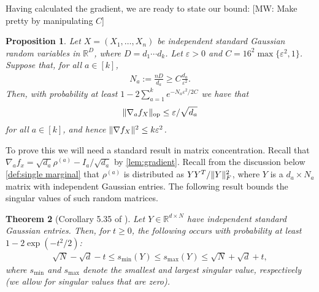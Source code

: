 \documentclass{article}
\newtheorem{theorem}{Theorem}
\newtheorem{prop}[theorem]{Proposition}
\DeclarePairedDelimiter{\norm}{\lVert}{\rVert}
\newcommand{\R}{{\mathbb{R}}}
\newcommand{\op}{\operatorname{op}}
\newcommand\eps{\varepsilon}
\newcommand\samp{x}
\newcommand\rv{X}
\newcommand{\MW}[1]{{\color{red}[MW: #1]}}
\begin{document}
Having calculated the gradient, we are ready to state our bound:
\MW{Make pretty by manipulating $C$}
\begin{prop}\label{prop:gradient-bound}
Let $\rv = (\rv_1,\dots,\rv_n)$ be independent standard Gaussian random variables in $\R^D$, where $D=d_1\cdots{}d_k$.
Let $\eps>0$ and $C = 16^2\max\{\eps^2,1\}$.
Suppose that, for all $a \in [k]$,
\begin{align*}
  N_a := \frac{n D}{d_a} \geq C \frac{d_a}{\eps^2}.
\end{align*}
Then, with probability at least $1 - 2 \sum_{a=1}^k e^{-N_a \eps^2/2C}$ we have that
\begin{align*}
  \norm{\nabla_a f_{\rv}}_{\op} \leq \eps/\sqrt{d_a}
\end{align*}
for all $a\in[k]$, and hence $\norm{\nabla f_{\rv}}^2 \leq k \eps^2$.
\end{prop}

To prove this we will need a standard result in matrix concentration.
Recall that $\nabla_a f_{\samp} = \sqrt{d_a} \rho^{(a)} - I_a/\sqrt{d_a}$ by \cref{lem:gradient}.
Recall from the discussion below \cref{def:single marginal} that $\rho^{(a)}$ is distributed as $Y Y^T / \norm{Y}_F^2$, where $Y$ is a $d_a \times N_a$ matrix with independent Gaussian entries.
The following result bounds the singular values of such random matrices.

\begin{theorem}[Corollary 5.35 of \cite{vershynin2010introduction}]\label{cor:vershynin}
Let $Y \in \R^{d \times N}$ have independent standard Gaussian entries.
Then, for $t \geq 0$, the following occurs with probability at least $1 - 2 \exp(-t^{2}/2)$:
\begin{align*}
  \sqrt{N} - \sqrt{d} - t \leq s_{\min}(Y) \leq s_{\max}(Y) \leq \sqrt{N} + \sqrt{d} + t,
\end{align*}
where $s_{\min}$ and $s_{\max}$ denote the smallest and largest singular value, respectively (we allow for singular values that are zero).
\end{theorem}
\end{document}
